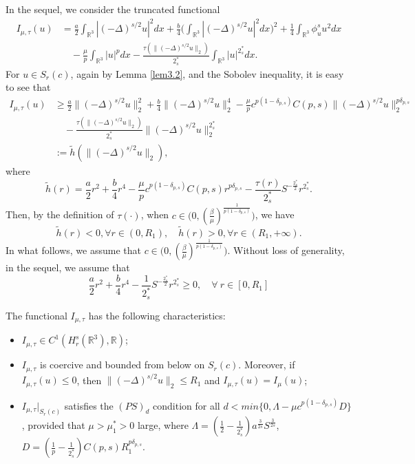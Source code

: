 \documentclass[reqno]{amsart}
\begin{document}
In the sequel, we consider the truncated functional
\begin{equation}
\begin{split}
I_{\mu,\tau}(u)
&= \frac{a}{2}\int_{\mathbb{R}^3}|(-\Delta)^{s/2}u|^2dx+\frac{b}{4}
 \Big(\int_{\mathbb{R}^3}|(-\Delta)^{s/2}u|^2dx\Big)^2
 +\frac{1}{4}\int_{\mathbb{R}^3}\phi^s_u u^2dx\\
&\quad -\frac{\mu}{p}\int_{\mathbb{R}^3}|u|^pdx
 -\frac{\tau(\|(-\Delta)^{s/2}u\|_2)}{2^*_s}\int_{\mathbb{R}^3}|u|^{2^*_s}dx.
\end{split}
\end{equation}
For $u\in S_{r}(c)$, again by Lemma \ref{lem3.2}, and the Sobolev inequality,
it is easy to see that
\begin{align*}
I_{\mu,\tau}(u)
&\geq  \frac{a}{2}\|(-\Delta)^{s/2}u\|^2_2+\frac{b}{4}\|(-\Delta)^{s/2}u\|^4_2
 -\frac{\mu}{p}c^{p(1-\delta_{p,s})}C({p,s})\|(-\Delta)^{s/2}u\|^{p\delta_{p,s}}_2\\
&\quad -\frac{\tau(\|(-\Delta)^{s/2}u\|_2)}{2^*_s}\|(-\Delta)^{s/2}u\|^{2^*_s}_2\\
&:= \tilde{h}(\|(-\Delta)^{s/2}u\|_2),
\end{align*}
where
$$
\tilde{h}(r)=\frac{a}{2}r^2+\frac{b}{4}r^4
-\frac{\mu}{p}c^{p(1-\delta_{p,s})}C({p,s})r^{p\delta_{p,s}}
-\frac{\tau(r)}{2^*_s}S^{-\frac{2^*_s}{2}}r^{2^*_s}.
$$
Then, by the definition of $\tau(\cdot)$, when
$c\in \big(0, (\frac{\beta}{\mu})^{\frac{1}{p(1-\delta_{p, s})}}\big)$, we have
$$
\tilde{h}(r)<0, \forall r\in(0, R_1),\quad
\tilde{h}(r)>0, \forall r\in(R_1, +\infty).
$$
In what follows, we  assume that
$c\in \big(0, (\frac{\beta}{\mu})^{\frac{1}{p(1-\delta_{p, s})}}\big)$.
Without loss of generality, in the sequel, we  assume that
\begin{equation}\label{1.9}
\frac{a}{2}r^2+\frac{b}{4}r^4-\frac{1}{2^*_s}S^{-\frac{2^*_s}{2}}r^{2^*_s}\geq 0,
\quad \forall ~r\in [0, R_1]
\end{equation}

\begin{lemma}\label{lem2.161}
The functional $I_{\mu,\tau}$ has the following characteristics:
\begin{itemize}
\item[(i)] $I_{\mu,\tau} \in C^1(H^s_{r}(\mathbb{R}^3), \mathbb{R})$;

\item[(ii)] $I_{\mu,\tau}$ is coercive and bounded from below on $S_{r}(c)$.
Moreover, if $I_{\mu,\tau}(u)\leq 0$, then $\|(-\Delta)^{s/2}u\|_2\leq R_1$ and
$I_{\mu,\tau}(u)=I_{\mu}(u)$;

\item[(iii)] $ I_{\mu,\tau}|_{S_{r}(c)}$ satisfies the $(PS)_d$ condition for all
$d<min\{0, \Lambda-\mu c^{p(1-\delta_{p,s})}D\}$, provided that $\mu>\mu^*_1>0$
large, where $\Lambda=(\frac{1}{2}-\frac{1}{2^*_s}) a^{\frac{3}{2s}}S^{\frac{3}{2s}}$,
$D=(\frac{1}{p}-\frac{1}{2^*_s})C(p,s)R_1^{p\delta_{p,s}}$.
\end{itemize}
\end{lemma}
\end{document}
